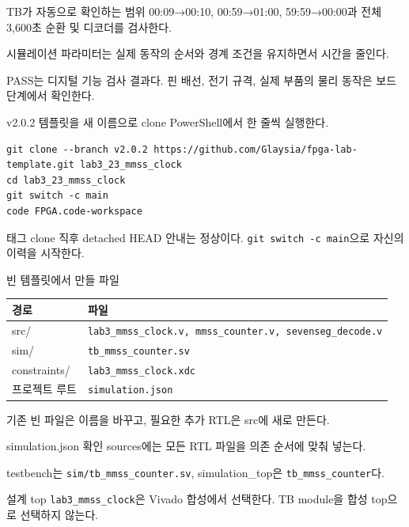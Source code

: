 \begin{frame}{TB가 자동으로 확인하는 범위}
\small
00:09→00:10, 00:59→01:00, 59:59→00:00과 전체 3,600초 순환 및 디코더를 검사한다.\par\vspace{0.28cm}
시뮬레이션 파라미터는 실제 동작의 순서와 경계 조건을 유지하면서 시간을 줄인다.\par\vspace{0.28cm}
PASS는 디지털 기능 검사 결과다. 핀 배선, 전기 규격, 실제 부품의 물리 동작은 보드 단계에서 확인한다.
\end{frame}

\begin{frame}[fragile,label=start]{v2.0.2 템플릿을 새 이름으로 clone}
\small
PowerShell에서 한 줄씩 실행한다.
\begin{lstlisting}[language={}]
git clone --branch v2.0.2 https://github.com/Glaysia/fpga-lab-template.git lab3_23_mmss_clock
cd lab3_23_mmss_clock
git switch -c main
code FPGA.code-workspace
\end{lstlisting}
태그 clone 직후 detached HEAD 안내는 정상이다. \texttt{git switch -c main}으로 자신의 이력을 시작한다.
\end{frame}

\begin{frame}{빈 템플릿에서 만들 파일}
\small
\begin{center}\renewcommand{\arraystretch}{1.35}\begin{tabular}{>{\raggedright\arraybackslash}p{2.25cm}p{7.2cm}}
경로 & 파일\\\hline
src/ & \texttt{lab3\_mmss\_clock.v, mmss\_counter.v, sevenseg\_decode.v}\\
sim/ & \texttt{tb\_mmss\_counter.sv}\\
constraints/ & \texttt{lab3\_mmss\_clock.xdc}\\
프로젝트 루트 & \texttt{simulation.json}\\
\end{tabular}\end{center}
기존 빈 파일은 이름을 바꾸고, 필요한 추가 RTL은 src에 새로 만든다.
\end{frame}

\begin{frame}{simulation.json 확인}
\small
sources에는 모든 RTL 파일을 의존 순서에 맞춰 넣는다.\par\vspace{0.25cm}
testbench는 \texttt{sim/tb\_mmss\_counter.sv}, simulation\_top은 \texttt{tb\_mmss\_counter}다.\par\vspace{0.25cm}
설계 top \texttt{lab3\_mmss\_clock}은 Vivado 합성에서 선택한다. TB module을 합성 top으로 선택하지 않는다.
\end{frame}

